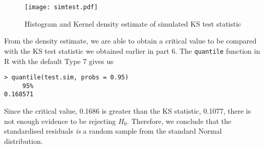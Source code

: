 \documentclass[11pt,a4]{article}
\begin{document}
\begin{itemize}
\begin{figure}[hbt!]
    \centering
    \texttt{[image: simtest.pdf]}
    \caption{Histogram and Kernel density estimate of simulated KS test statistic}
    \label{fig:7}
\end{figure}

From the density estimate, we are able to obtain a critical value to be compared with the KS test statistic we obtained earlier in part 6. The \verb|quantile| function in R with the default Type 7 gives us

\begin{verbatim}
> quantile(test.sim, probs = 0.95)
     95% 
0.168571 
\end{verbatim}

Since the critical value, 0.1686 is greater than the KS statistic, 0.1077, there is not enough evidence to be rejecting $H_{0}$. Therefore, we conclude that the standardised residuals \emph{is} a random sample from the standard Normal distribution.

\end{itemize}	
\end{document}

